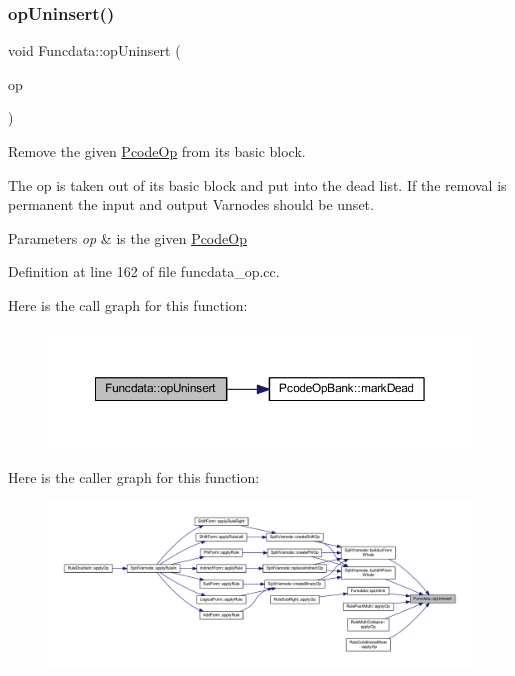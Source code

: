 \subsubsection{\texorpdfstring{opUninsert()}{opUninsert()}}
{\footnotesize\ttfamily void Funcdata\+::op\+Uninsert (\begin{DoxyParamCaption}\item[{\mbox{\hyperlink{class_pcode_op}{Pcode\+Op}} $\ast$}]{op }\end{DoxyParamCaption})}



Remove the given \mbox{\hyperlink{class_pcode_op}{Pcode\+Op}} from its basic block. 

The op is taken out of its basic block and put into the dead list. If the removal is permanent the input and output Varnodes should be unset. 
\begin{DoxyParams}{Parameters}
{\em op} & is the given \mbox{\hyperlink{class_pcode_op}{Pcode\+Op}} \\
\hline
\end{DoxyParams}


Definition at line 162 of file funcdata\+\_\+op.\+cc.

Here is the call graph for this function\+:
\nopagebreak
\begin{figure}[H]
\begin{center}
\leavevmode
\includegraphics[width=350pt]{class_funcdata_aacf0cf87976170d62df42411ffe1e10a_cgraph}
\end{center}
\end{figure}
Here is the caller graph for this function\+:
\nopagebreak
\begin{figure}[H]
\begin{center}
\leavevmode
\includegraphics[width=350pt]{class_funcdata_aacf0cf87976170d62df42411ffe1e10a_icgraph}
\end{center}
\end{figure}
\mbox{\label{class_funcdata_a495ebac694bc98d041e29ce05eece6f9}} 
